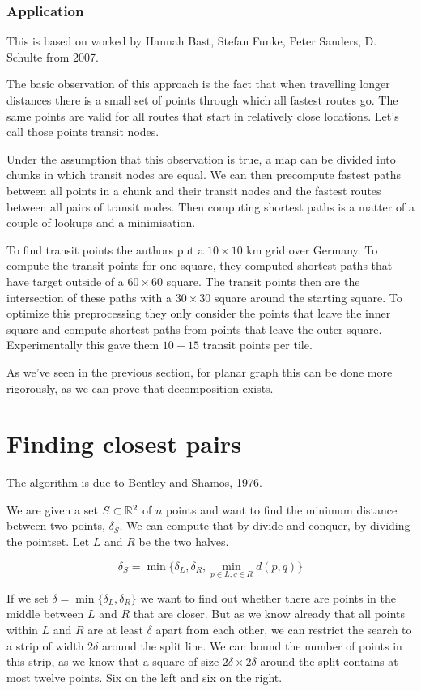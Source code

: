 \subsubsection{Application}

This is based on worked by Hannah Bast, Stefan Funke, Peter Sanders, D. Schulte from 2007.

The basic observation of this approach is the fact that when travelling longer distances there is a small set of points through which all fastest routes go. The same points are valid for all routes that start in relatively close locations. Let's call those points transit nodes.

Under the assumption that this observation is true, a map can be divided into chunks in which transit nodes are equal. We can then precompute fastest paths between all points in a chunk and their transit nodes and the fastest routes between all pairs of transit nodes. Then computing shortest paths is a matter of a couple of lookups and a minimisation.

To find transit points the authors put a $10\times 10$ km grid over Germany. To compute the transit points for one square, they computed shortest paths that have target outside of a $60\times 60$ square. The transit points then are the intersection of these paths with a $30\times 30$ square around the starting square. To optimize this preprocessing they only consider the points that leave the inner square and compute shortest paths from points that leave the outer square. Experimentally this gave them $10-15$ transit points per tile.

As we've seen in the previous section, for planar graph this can be done more rigorously, as we can prove that decomposition exists.

\section{Finding closest pairs}

The algorithm is due to Bentley and Shamos, 1976.

We are given a set $S\subset \mathbb{R}^2$ of $n$ points and want to find the minimum distance between two points, $\delta_S$. We can compute that by divide and conquer, by dividing the pointset. Let $L$ and $R$ be the two halves.

\[\delta_S = \min \{\delta_L, \delta_R, \min_{p\in L, q\in R} d(p,q)\}\]

If we set $\delta = \min \{\delta_L, \delta_R\}$ we want to find out whether there are points in the middle between $L$ and $R$ that are closer. But as we know already that all points within $L$ and $R$ are at least $\delta$ apart from each other, we can restrict the search to a strip of width $2\delta$ around the split line. We can bound the number of points in this strip, as we know that a square of size $2\delta \times 2\delta$ around the split contains at most twelve points. Six on the left and six on the right. 

